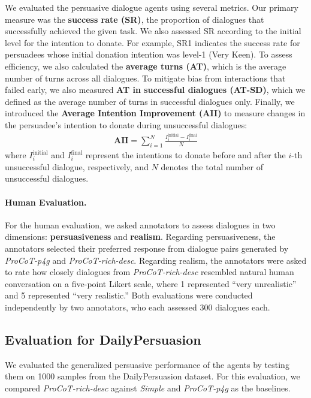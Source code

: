 \documentclass[11pt]{article}
\begin{document}
We evaluated the persuasive dialogue agents using several metrics. 
Our primary measure was the \textbf{success rate (SR)}, the proportion of dialogues that successfully achieved the given task. 
We also assessed SR according to the initial level for the intention to donate.
For example, SR1 indicates the success rate for persuadees whose initial donation intention was level-1 (Very Keen).
To assess efficiency, we also calculated the \textbf{average turns (AT)}, which is the average number of turns across all dialogues. 
To mitigate bias from interactions that failed early, we also measured \textbf{AT in successful dialogues (AT-SD)}, which we defined as the average number of turns in successful dialogues only.
Finally, we introduced the \textbf{Average Intention Improvement (AII)} to measure changes in the persuadee's intention to donate during unsuccessful dialogues:
\begin{gather}
    \textbf{AII} = {\sum}_{i=1}^N \frac{I^{\text{initial}}_{i} - I^{\text{final}}_{i}}{N}
\end{gather}
where $I^{\text{initial}}_{i}$ and $I^{\text{final}}_{i}$ represent the intentions to donate before and after the $i$-th unsuccessful dialogue, respectively, and $N$ denotes the total number of unsuccessful dialogues.

\paragraph{Human Evaluation.}
For the human evaluation, we asked annotators to assess dialogues in two dimensions: \textbf{persuasiveness} and \textbf{realism}.
Regarding persuasiveness, the annotators selected their preferred response from dialogue pairs generated by \textit{ProCoT-p4g} and \textit{ProCoT-rich-desc}. 
Regarding realism, the annotators were asked to rate how closely dialogues from \textit{ProCoT-rich-desc} resembled natural human conversation on a five-point Likert scale, where 1 represented ``very unrealistic'' and 5 represented ``very realistic.''
Both evaluations were conducted independently by two annotators, who each assessed 300 dialogues each.

\subsection{Evaluation for DailyPersuasion}
We evaluated the generalized persuasive performance of the agents by testing them on 1000 samples from the DailyPersuasion dataset. 
For this evaluation, we compared \textit{ProCoT-rich-desc} against \textit{Simple} and \textit{ProCoT-p4g} as the baselines.
\end{document}
